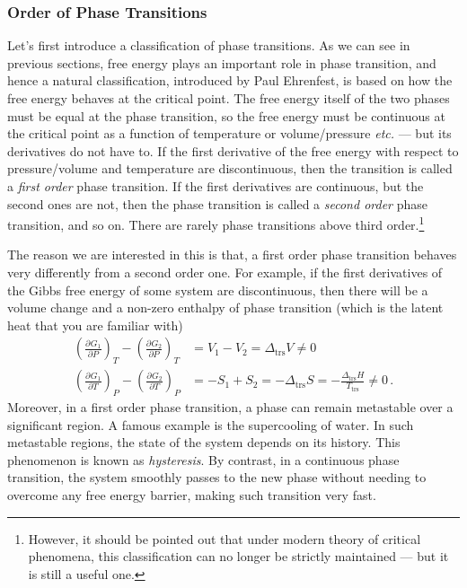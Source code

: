 \documentclass{article}
\theoremstyle{plain}\theoremheaderfont{\normalfont\bfseries}\theorembodyfont{\rmfamily}\theoremseparator{.}\newtheorem*{thm}{Theorem}\newtheorem*{law}{Law}\newtheorem*{pos}{Postulate}
\numberwithin{equation}{section}
\newcommand{\pdv}[3][]{\frac{\partial^{#1} #2}{{\partial #3}^{#1}}}
\begin{document}
    \subsubsection{Order of Phase Transitions}
    Let's first introduce a classification of phase transitions. As we can see in previous sections, free energy plays an important role in phase transition, and hence a natural classification, introduced by Paul Ehrenfest, is based on how the free energy behaves at the critical point. The free energy itself of the two phases must be equal at the phase transition, so the free energy must be continuous at the critical point as a function of temperature or volume/pressure \textit{etc.} --- but its derivatives do not have to. If the first derivative of the free energy with respect to pressure/volume and temperature are discontinuous, then the transition is called a \textit{first order} phase transition. If the first derivatives are continuous, but the second ones are not, then the phase transition is called a \textit{second order} phase transition, and so on. There are rarely phase transitions above third order.\footnote{However, it should be pointed out that under modern theory of critical phenomena, this classification can no longer be strictly maintained --- but it is still a useful one.}

    The reason we are interested in this is that, a first order phase transition behaves very differently from a second order one. For example, if the first derivatives of the Gibbs free energy of some system are discontinuous, then there will be a volume change and a non-zero enthalpy of phase transition (which is the latent heat that you are familiar with)
    \begin{align}
        \left(\pdv{G_1}{P}\right)_T-\left(\pdv{G_2}{P}\right)_{T}&=V_1-V_2=\Delta_\text{trs}V\ne 0\\
        \left(\pdv{G_1}{T}\right)_{P}-\left(\pdv{G_2}{T}\right)_P&=-S_1+S_2=-\Delta_{\text{trs}}S=-\frac{\Delta_{\text{trs}}H}{T_{\text{trs}}}\ne 0\,.
    \end{align}
    Moreover, in a first order phase transition, a phase can remain metastable over a significant region. A famous example is the supercooling of water. In such metastable regions, the state of the system depends on its history. This phenomenon is known as \textit{hysteresis}. By contrast, in a continuous phase transition, the system smoothly passes to the new phase without needing to overcome any free energy barrier, making such transition very fast.
\end{document}
